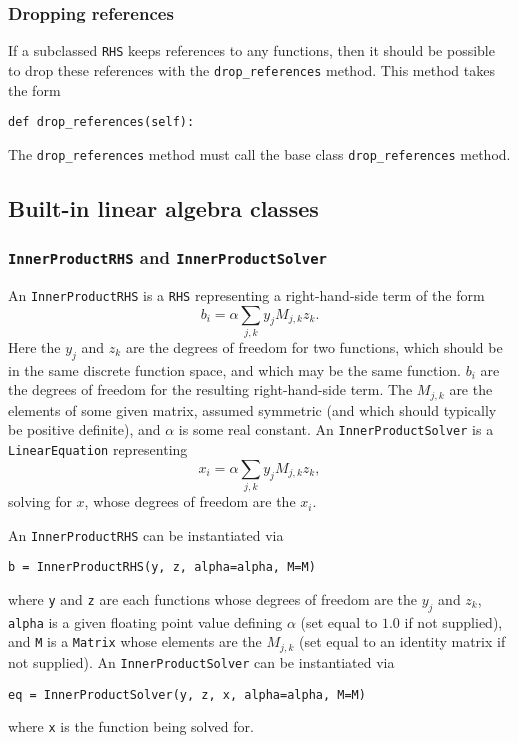 \documentclass[11pt]{article}
\begin{document}
\subsubsection{Dropping references}

If a subclassed \texttt{RHS} keeps references to any functions, then it should
be possible to drop these references with the \texttt{drop\_references} method.
This method takes the form
\begin{lstlisting}
def drop_references(self):
\end{lstlisting}
The \texttt{drop\_references} method must call the base class
\texttt{drop\_references} method.

\subsection{Built-in linear algebra classes}

\subsubsection{\texttt{InnerProductRHS} and \texttt{InnerProductSolver}}

An \texttt{InnerProductRHS} is a \texttt{RHS} representing a right-hand-side
term of the form
\begin{equation*}
  b_i = \alpha \sum_{j,k} y_j M_{j,k} z_k.
\end{equation*}
Here the $y_j$ and $z_k$ are the degrees of freedom for two functions, which
should be in the same discrete function space, and which may be the same
function. $b_i$ are the degrees of freedom for the resulting right-hand-side
term. The $M_{j,k}$ are the elements of some given matrix, assumed symmetric
(and which should typically be positive definite), and $\alpha$ is some real
constant. An \texttt{InnerProductSolver} is a \texttt{LinearEquation}
representing
\begin{equation*}
  x_i = \alpha \sum_{j,k} y_j M_{j,k} z_k,
\end{equation*}
solving for $x$, whose degrees of freedom are the $x_i$.

An \texttt{InnerProductRHS} can be instantiated via
\begin{lstlisting}
b = InnerProductRHS(y, z, alpha=alpha, M=M)
\end{lstlisting}
where \texttt{y} and \texttt{z} are each functions whose degrees of freedom are
the $y_j$ and $z_k$, \texttt{alpha} is a given floating point value defining
$\alpha$ (set equal to $1.0$ if not supplied), and \texttt{M} is a
\texttt{Matrix} whose elements are the $M_{j,k}$ (set equal to an identity
matrix if not supplied). An \texttt{InnerProductSolver} can be instantiated via
\begin{lstlisting}
eq = InnerProductSolver(y, z, x, alpha=alpha, M=M)
\end{lstlisting}
where \texttt{x} is the function being solved for.
\end{document}
